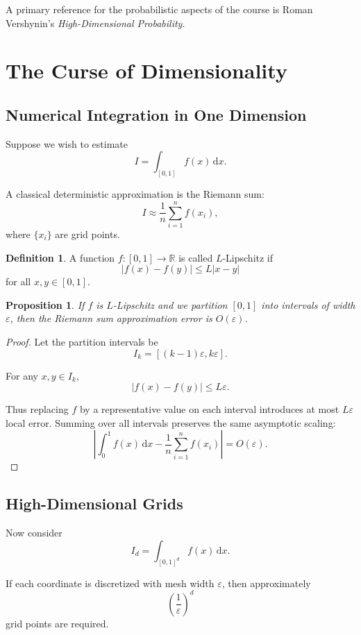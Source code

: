 \documentclass[12pt,oneside]{book}
\numberwithin{equation}{section}
\theoremstyle{definition}
\newtheorem{definition}{Definition}[section]
\theoremstyle{plain}
\newtheorem{proposition}{Proposition}[section]
\theoremstyle{remark}
\newcommand{\R}{\mathbb{R}}
\newcommand{\dd}{\,\mathrm{d}}
\begin{document}
A primary reference for the probabilistic aspects of the course is Roman Vershynin's \emph{High-Dimensional Probability}.  

\section{The Curse of Dimensionality}

\subsection{Numerical Integration in One Dimension}

Suppose we wish to estimate
\[
I = \int_{[0,1]} f(x)\dd x.
\]

A classical deterministic approximation is the Riemann sum:
\[
I \approx \frac{1}{n}\sum_{i=1}^n f(x_i),
\]
where $\{x_i\}$ are grid points.

\begin{definition}
A function $f:[0,1]\to\R$ is called $L$-Lipschitz if
\[
|f(x)-f(y)| \leq L|x-y|
\]
for all $x,y\in[0,1]$.
\end{definition}

\begin{proposition}
If $f$ is $L$-Lipschitz and we partition $[0,1]$ into intervals of width $\varepsilon$, then the Riemann sum approximation error is $O(\varepsilon)$.
\end{proposition}

\begin{proof}
Let the partition intervals be
\[
I_k = [(k-1)\varepsilon,k\varepsilon].
\]

For any $x,y\in I_k$,
\[
|f(x)-f(y)| \leq L\varepsilon.
\]

Thus replacing $f$ by a representative value on each interval introduces at most $L\varepsilon$ local error. Summing over all intervals preserves the same asymptotic scaling:
\[
\left|
\int_0^1 f(x)\dd x
-
\frac{1}{n}\sum_{i=1}^n f(x_i)
\right|
= O(\varepsilon).
\]
\end{proof}

\subsection{High-Dimensional Grids}

Now consider
\[
I_d = \int_{[0,1]^d} f(x)\dd x.
\]

If each coordinate is discretized with mesh width $\varepsilon$, then approximately
\[
\left(\frac{1}{\varepsilon}\right)^d
\]
grid points are required.
\end{document}
